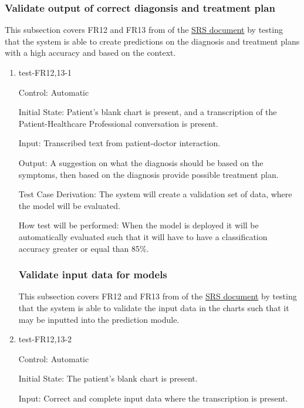 \documentclass[12pt, titlepage]{article}
\begin{document}
\subsubsection{Validate output of correct diagonsis and treatment plan} \label{section:4.1.6}

This subsection covers FR12 and FR13 from of the \href{https://github.com/Inreet-Kaur/capstone/blob/main/docs/SRS/SRS.pdf} {SRS document} by testing that the system is able to create predictions on the diagnosis and treatment plans with a high accuracy and based on the context.

\begin{enumerate}

\item{test-FR12,13-1} \label{test-FR12,13-1}

Control: Automatic

Initial State: Patient's blank chart is present, and a transcription of the Patient-Healthcare Professional conversation is present.

Input: Transcribed text from patient-doctor interaction.

Output: A suggestion on what the diagnosis should be based on the symptoms, then based on the diagnosis provide possible treatment plan.

Test Case Derivation: The system will create a validation set of data, where the model will be evaluated. 

How test will be performed: When the model is deployed it will be automatically evaluated such that it will have to have a classification accuracy greater or equal than 85\%.



\subsubsection{Validate input data for models} \label{section:4.1.7}
This subsection covers FR12 and FR13 from of the \href{https://github.com/Inreet-Kaur/capstone/blob/main/docs/SRS/SRS.pdf} {SRS document} by testing that the system is able to validate the input data in the charts such that it may be inputted into the prediction module.


\item{test-FR12,13-2} \label{test-FR12,13-2}

Control: Automatic

Initial State: The patient's blank chart is present.

Input: Correct and complete input data where the transcription is present.


\end{enumerate}
\end{document}
